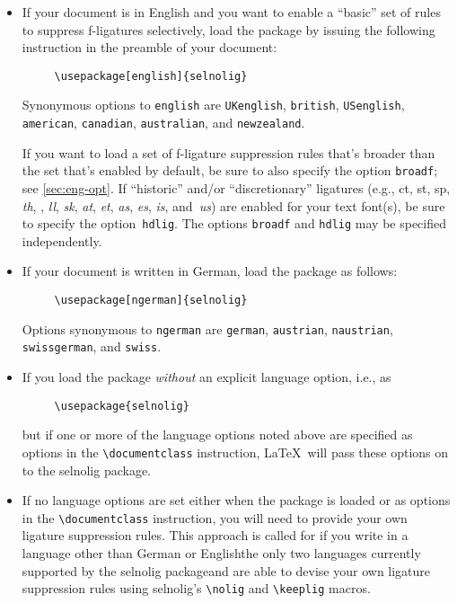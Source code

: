 \documentclass[11pt]{article}
\newcommand{\pkg}[1]{\textsf{#1}}
\newcommand{\opt}[1]{\texttt{#1}}
\newcommand{\cmmd}[1]{\texttt{\textbackslash #1}}
\begin{document}
\begin{itemize}
\item If your document is in English and you want to enable a \enquote{basic} set of rules to suppress f-ligatures selectively, load the package by issuing the following instruction in the preamble of your document:
\begin{Verbatim}
     \usepackage[english]{selnolig}
\end{Verbatim}
Synonymous options to \opt{english} are \opt{UKenglish}, \opt{british}, \opt{USenglish}, \opt{american}, \opt{cana\-dian}, \opt{australian}, and \opt{new\-zea\-land}.

If you want to load a set of f-ligature suppression rules that's broader than the set that's enabled by default, be sure to also specify the option \opt{broadf}; see \cref{sec:eng-opt}. If \enquote{historic} and/or \enquote{discretionary} ligatures (e.g., ct, st, sp, \emph{th}, \emph{}, \emph{ll}, \emph{\ebg sk}, \emph{at}, \emph{et}, \emph{as}, \emph{\ebg es}, \emph{is}, and~\emph{us}) are enabled for your text font(s), be sure to specify the option~\opt{hdlig}. The options \opt{broadf} and \opt{hdlig} may be specified independently.

\enlargethispage{1\baselineskip}

\item If your document is written in German, load the package as follows:
\begin{Verbatim}
     \usepackage[ngerman]{selnolig}
\end{Verbatim}
Options synonymous to \opt{ngerman} are \opt{german}, \opt{austrian}, \opt{naustrian}, \opt{swissgerman}, and \opt{swiss}.

\item If you load the package \emph{without} an explicit language option, i.e., as
\begin{Verbatim}
     \usepackage{selnolig}
\end{Verbatim}
but if one or more of the language options noted above are specified as options in the \cmmd{documentclass} instruction, \LaTeX\ will pass these options on to the \pkg{selnolig} package.

\item If no language options are set either when the package is loaded or as options in the \cmmd{documentclass} instruction, you will need to provide your own ligature suppression rules. This approach is called for if you write in a language other than German or English\textemdash the only two languages currently supported by the \pkg{selnolig} package\textemdash and are able to devise your own ligature suppression rules using \pkg{selnolig}'s \cmmd{nolig} and \cmmd{keeplig} macros.

\end{itemize}
\end{document}
